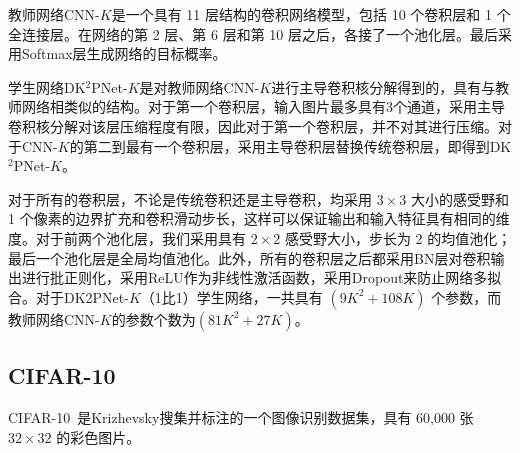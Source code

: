 教师网络CNN-$K$是一个具有 11 层结构的卷积网络模型，包括 10 个卷积层和 1 个全连接层。在网络的第 2 层、第 6 层和第 10 层之后，各接了一个池化层。最后采用Softmax层生成网络的目标概率。

学生网络DK$^2$PNet-$K$是对教师网络CNN-$K$进行主导卷积核分解得到的，具有与教师网络相类似的结构。对于第一个卷积层，输入图片最多具有3个通道，采用主导卷积核分解对该层压缩程度有限，因此对于第一个卷积层，并不对其进行压缩。对于CNN-$K$的第二到最有一个卷积层，采用主导卷积层替换传统卷积层，即得到DK$^2$PNet-$K$。

对于所有的卷积层，不论是传统卷积还是主导卷积，均采用 $3\times3$ 大小的感受野和 1 个像素的边界扩充和卷积滑动步长，这样可以保证输出和输入特征具有相同的维度。对于前两个池化层，我们采用具有 $2\times2$ 感受野大小，步长为 2 的均值池化；最后一个池化层是全局均值池化。此外，所有的卷积层之后都采用BN层对卷积输出进行批正则化，采用ReLU作为非线性激活函数，采用Dropout来防止网络多拟合。对于DK2PNet-$K$（1比1）学生网络，一共具有 $(9K^2+108K)$ 个参数，而教师网络CNN-$K$的参数个数为$(81K^2+27K)$。


\subsection{CIFAR-10}
\label{sec:acc:experiment:cifar10}

CIFAR-10~\cite{krizhevsky2009learning}是Krizhevsky搜集并标注的一个图像识别数据集，具有 60,000 张 $32\times32$ 的彩色图片。


